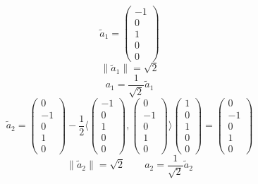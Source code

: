 \documentclass[a4paper]{article}
\theoremstyle{definition}
\newcommand\ip[2]{\langle{#1},{#2}\rangle}
\newcommand\norm[1]{\left\|{#1}\right\|}
\begin{document}
\[ \tilde a_1 = \begin{pmatrix} -1 \\ 0 \\ 1 \\ 0 \\ 0 \end{pmatrix} \]
\[ \norm{\tilde a_1} = \sqrt2 \]
\[ a_1 = \frac1{\sqrt2} \tilde a_1 \]
\[ \tilde a_2 = \begin{pmatrix} 0 \\ -1 \\ 0 \\ 1 \\ 0 \end{pmatrix} - \frac12 \ip{\begin{pmatrix} -1 \\ 0 \\ 1 \\ 0 \\ 0 \end{pmatrix}}{\begin{pmatrix} 0 \\ -1 \\ 0 \\ 1 \\ 0 \end{pmatrix}} \begin{pmatrix} 1 \\ 0 \\ 1 \\ 0 \\ 0 \end{pmatrix} = \begin{pmatrix} 0 \\ -1 \\ 0 \\ 1 \\ 0 \end{pmatrix} \]
\[ \norm{\tilde a_2} = \sqrt2 \qquad a_2 = \frac1{\sqrt{2}} \tilde a_2 \]
\end{document}
